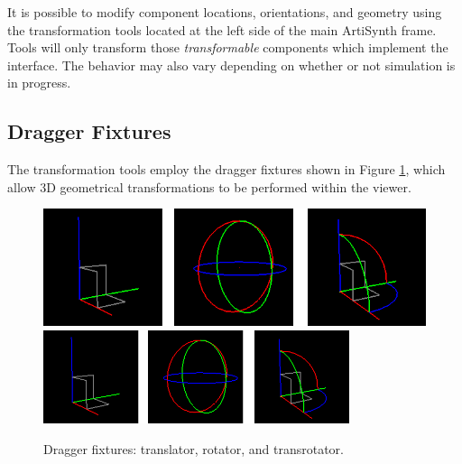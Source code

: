 \documentclass{article}
\begin{document}
It is possible to modify component locations, orientations, and
geometry using the transformation tools located at the left side of
the main ArtiSynth frame.  Tools will only transform those {\it
transformable} components which implement the
 interface. The
behavior may also vary depending on whether or not simulation is in
progress.

\subsection{Dragger Fixtures}
\label{draggerFixturesSec}

The transformation tools employ the dragger fixtures shown
in Figure \ref{transformToolsFig}, which allow 3D geometrical
transformations to be performed within the viewer.

\begin{figure}
\begin{center}
\iflatexml
\includegraphics[]{images/transformTools}
\else
\includegraphics[width=0.80\textwidth]{images/transformTools}
\fi
\end{center}
\caption{Dragger fixtures: translator, rotator, and transrotator.}%
\label{transformToolsFig}
\end{figure}
\end{document}
